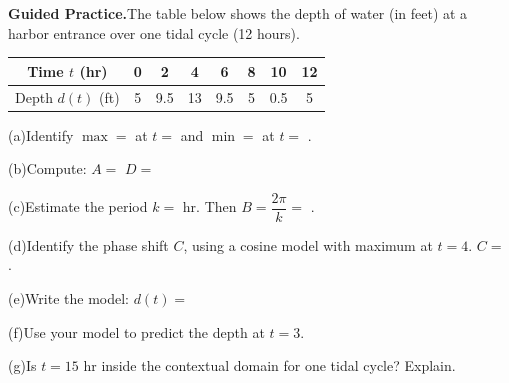 \documentclass[10pt]{article}
\begin{document}
\begin{practicebox}

\textbf{Guided Practice.}\quad The table below shows the depth of water (in feet)
at a harbor entrance over one tidal cycle (12 hours).

\vspace{4pt}
\begin{center}
\renewcommand{\arraystretch}{1.35}
\begin{tabular}{|c|c|c|c|c|c|c|c|}
\hline
Time $t$ (hr) & 0 & 2 & 4 & 6 & 8 & 10 & 12 \\
\hline
Depth $d(t)$ (ft) & 5 & 9.5 & 13 & 9.5 & 5 & 0.5 & 5 \\
\hline
\end{tabular}
\end{center}

\vspace{4pt}
(a)\quad Identify $\max = $  at $t = $ 
and $\min = $  at $t = $ .

\vspace{4pt}
(b)\quad Compute: $A = $  \quad $D = $ 

\vspace{4pt}
(c)\quad Estimate the period $k = $  hr. \quad Then $B = \dfrac{2\pi}{k} = $ .

\vspace{4pt}
(d)\quad Identify the phase shift $C$, using a cosine model with maximum at $t = 4$. $C = $ .

\vspace{4pt}
(e)\quad Write the model: $d(t) = $ 

\vspace{4pt}
(f)\quad Use your model to predict the depth at $t = 3$.

\vspace{4pt}
(g)\quad Is $t = 15$ hr inside the contextual domain for one tidal cycle? Explain.

\end{practicebox}
\end{document}
